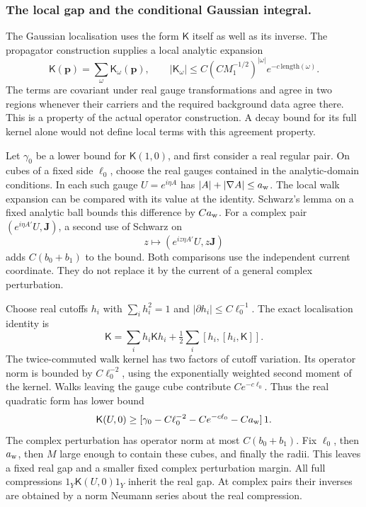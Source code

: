 \documentclass[11pt,letterpaper,reqno]{amsart}
\theoremstyle{definition}
\theoremstyle{remark}
\begin{document}
\subsubsection*{The local gap and the conditional Gaussian integral.}
The Gaussian localisation uses the form $\mathsf K$ itself as
well as its inverse. The propagator construction supplies a
local analytic expansion
\[
 \mathsf K(\mathbf p)=\sum_\omega\mathsf K_\omega(\mathbf p),
 \qquad
 |\mathsf K_\omega|
 \le C(CM_1^{-1/2})^{|\omega|}e^{-c\,\mathrm{length}(\omega)}.
\]
The terms are covariant under real gauge transformations and
agree in two regions whenever their carriers and the required
background data agree there. This is a property of the actual
operator construction. A decay bound for its full kernel alone
would not define local terms with this agreement property.

Let $\gamma_0$ be a lower bound for $\mathsf K(1,0)$, and
first consider a real regular pair. On cubes of a fixed side
$\ell_0$, choose the real gauges contained in the analytic-domain
conditions. In each such gauge $U=e^{i\eta A}$ has
$|A|+|\nabla A|\le a_{\rm w}$. The local walk expansion can be
compared with its value at the identity. Schwarz's lemma on a
fixed analytic ball bounds this difference by $Ca_{\rm w}$.
For a complex pair $(e^{i\eta A'}U,\mathbf J)$, a second use
of Schwarz on
\[
 z\longmapsto (e^{iz\eta A'}U,z\mathbf J)
\]
adds $C(b_0+b_1)$ to the bound. Both comparisons use the
independent current coordinate. They do not replace it by the
current of a general complex perturbation.

Choose real cutoffs $h_i$ with $\sum_i h_i^2=1$ and
$|\partial h_i|\le C\ell_0^{-1}$. The exact localisation identity
is
\[
 \mathsf K=\sum_i h_i\mathsf Kh_i
                  +\tfrac12\sum_i[h_i,[h_i,\mathsf K]].
\]
The twice-commuted walk kernel has two factors of cutoff
variation. Its operator norm is bounded by $C\ell_0^{-2}$,
using the exponentially weighted second moment of the kernel.
Walks leaving the gauge cube contribute $Ce^{-c\ell_0}$.
Thus the real quadratic form has lower bound
\begin{equation}\label{eq:deep-full-gap}
 \mathsf K(U,0)\ge
 [\gamma_0-C\ell_0^{-2}-Ce^{-c\ell_0}-Ca_{\rm w}]\,1.
\end{equation}
The complex perturbation has operator norm at most
$C(b_0+b_1)$. Fix $\ell_0$, then $a_{\rm w}$, then $M$ large
enough to contain these cubes, and finally the radii. This leaves
a fixed real gap and a smaller fixed complex perturbation margin.
All full compressions $1_Y\mathsf K(U,0)1_Y$ inherit the real
gap. At complex pairs their inverses are obtained by a norm
Neumann series about the real compression.
\end{document}
